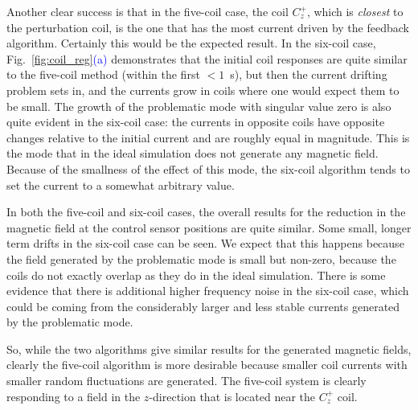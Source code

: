 Another clear success is that in the five-coil case, the coil $C_z^+$,
which is {\it closest} to the perturbation coil, is the one that has
the most current driven by the feedback algorithm.  Certainly this
would be the expected result.  In the six-coil case,
Fig.~\ref{fig:coil_reg}\textcolor{blue}{(a)} demonstrates that the initial coil
responses are quite similar to the five-coil method (within the first
$<1$~s), but then the current drifting problem sets in, and the
currents grow in coils where one would expect them to be small.  The
growth of the problematic mode with singular value zero is also quite
evident in the six-coil case: the currents in opposite coils have
opposite changes relative to the initial current and are roughly equal
in magnitude.  This is the mode that in the ideal simulation does not
generate any magnetic field.  Because of the smallness of the effect
of this mode, the six-coil algorithm tends to set the current to a
somewhat arbitrary value.

In both the five-coil and six-coil cases, the overall results for the
reduction in the magnetic field at the control sensor positions are
quite similar.  Some small, longer term drifts in the six-coil case
can be seen.  We expect that this happens because the field generated
by the problematic mode is small but non-zero, because the coils do
not exactly overlap as they do in the ideal simulation.  There is some
evidence that there is additional higher frequency noise in the
six-coil case, which could be coming from the considerably larger and
less stable currents generated by the problematic mode.

So, while the two algorithms give similar results for the generated
magnetic fields, clearly the five-coil algorithm is more desirable
because smaller coil currents with smaller random fluctuations are
generated.  The five-coil system is clearly responding to a field in
the $z$-direction that is located near the $C_z^+$ coil.


